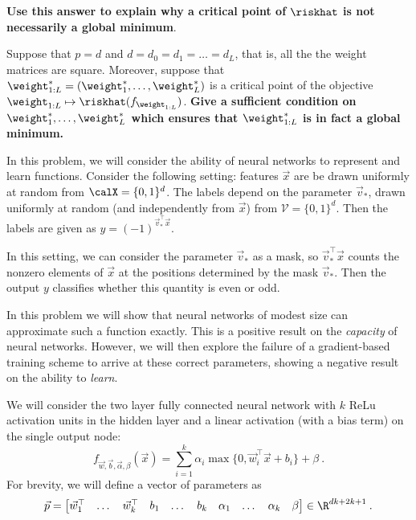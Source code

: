 \documentclass[11pt]{article}
\begin{document}
\begin{Parts}
\textbf{Use this answer to explain why a critical point of $\riskhat$ is not necessarily a global minimum}.

\begin{tcolorbox}[breakable]
\end{tcolorbox}

\Part
Suppose that $p = d$ and $d = d_0 = d_1 = \dots = d_L$, that is, all the the weight matrices are square. Moreover, suppose that ${\weight}^*_{1:L} = ({\weight}^*_1,\dots,{\weight}^*_L)$ is a critical point of the objective $\weight_{1:L} \mapsto \riskhat(f_{\weight_{1:L}})$. \textbf{Give a sufficient condition on ${\weight}^*_1,\dots,{\weight}^*_L$ which ensures that ${\weight}^*_{1:L}$ is in fact a global minimum.}

\begin{tcolorbox}[breakable]
\end{tcolorbox}

\end{Parts}

\newcommand{\calV}{\mathcal{V}}
\newcommand{\1}{\mathbf{1}}

In this problem, we will consider the ability of neural networks to represent and learn functions. 
Consider the following setting: features $\vec x$ are be drawn uniformly at random from $\calX = \{0,1\}^d$. The labels depend on the parameter $\vec v_*$, drawn uniformly at random (and independently from $\vec x$) from $\calV = \{0,1\}^d$. 
Then the labels are given as $y = (-1)^{\vec v_*^\top \vec x}$.

In this setting, we can consider the parameter $\vec v_*$ as a mask, so $\vec v_*^\top \vec x$ counts the nonzero elements of $\vec x$ at the positions determined by the mask $\vec v_*$. Then the output $y$ classifies whether this quantity is even or odd.

In this problem we will show that neural networks of modest size can approximate such a function exactly. This is a positive result on the \emph{capacity} of neural networks. However, we will then explore the failure of a gradient-based training scheme to arrive at these correct parameters, showing a negative result on the ability to \emph{learn}.

We will consider the two layer fully connected neural network with $k$ ReLu activation units in the hidden layer and a linear activation (with a bias term) on the single output node:
\[f_{\vec w, \vec b, \vec\alpha,\beta}(\vec x) = \sum_{i=1}^k \alpha_{i} \max\{0,\vec w_{i}^\top \vec x + b_{i}\} + \beta\:.\]
For brevity, we will define a vector of parameters as
\[\vec p = \begin{bmatrix} \vec w_1^\top & \dots & \vec w_k^\top & b_1 & \dots & b_k & \alpha_1 & \dots & \alpha_k & \beta \end{bmatrix} \in \R^{dk+2k+1}\:.\]
\end{document}
